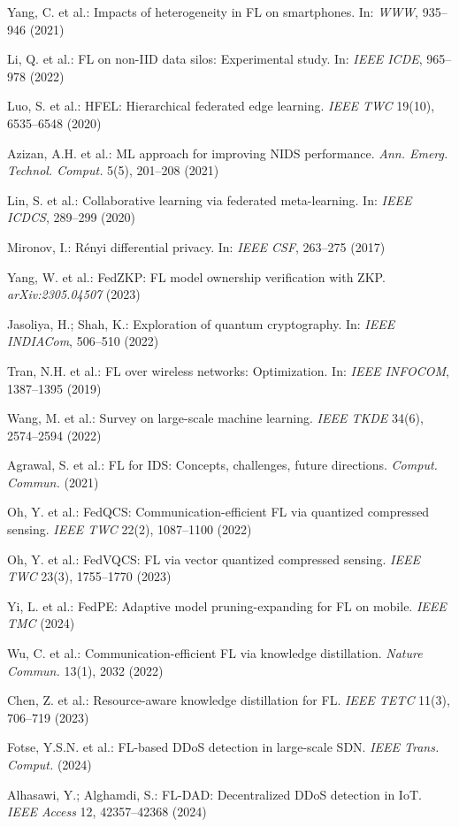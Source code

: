 \documentclass[a4paper]{article}
\begin{document}
\begin{enumerate}[leftmargin=0.8cm, itemsep=0pt, parsep=0pt, label={[\arabic*]}]
\item Yang, C. et al.: Impacts of heterogeneity in FL on smartphones. In: \textit{WWW}, 935--946 (2021)
\item Li, Q. et al.: FL on non-IID data silos: Experimental study. In: \textit{IEEE ICDE}, 965--978 (2022)
\item Luo, S. et al.: HFEL: Hierarchical federated edge learning. \textit{IEEE TWC} 19(10), 6535--6548 (2020)
\item Azizan, A.H. et al.: ML approach for improving NIDS performance. \textit{Ann. Emerg. Technol. Comput.} 5(5), 201--208 (2021)
\item Lin, S. et al.: Collaborative learning via federated meta-learning. In: \textit{IEEE ICDCS}, 289--299 (2020)
\item Mironov, I.: R\'enyi differential privacy. In: \textit{IEEE CSF}, 263--275 (2017)
\item Yang, W. et al.: FedZKP: FL model ownership verification with ZKP. \textit{arXiv:2305.04507} (2023)
\item Jasoliya, H.; Shah, K.: Exploration of quantum cryptography. In: \textit{IEEE INDIACom}, 506--510 (2022)
\item Tran, N.H. et al.: FL over wireless networks: Optimization. In: \textit{IEEE INFOCOM}, 1387--1395 (2019)
\item Wang, M. et al.: Survey on large-scale machine learning. \textit{IEEE TKDE} 34(6), 2574--2594 (2022)
\item Agrawal, S. et al.: FL for IDS: Concepts, challenges, future directions. \textit{Comput. Commun.} (2021)
\item Oh, Y. et al.: FedQCS: Communication-efficient FL via quantized compressed sensing. \textit{IEEE TWC} 22(2), 1087--1100 (2022)
\item Oh, Y. et al.: FedVQCS: FL via vector quantized compressed sensing. \textit{IEEE TWC} 23(3), 1755--1770 (2023)
\item Yi, L. et al.: FedPE: Adaptive model pruning-expanding for FL on mobile. \textit{IEEE TMC} (2024)
\item Wu, C. et al.: Communication-efficient FL via knowledge distillation. \textit{Nature Commun.} 13(1), 2032 (2022)
\item Chen, Z. et al.: Resource-aware knowledge distillation for FL. \textit{IEEE TETC} 11(3), 706--719 (2023)
\item Fotse, Y.S.N. et al.: FL-based DDoS detection in large-scale SDN. \textit{IEEE Trans. Comput.} (2024)
\item Alhasawi, Y.; Alghamdi, S.: FL-DAD: Decentralized DDoS detection in IoT. \textit{IEEE Access} 12, 42357--42368 (2024)

\end{enumerate}
\end{document}
